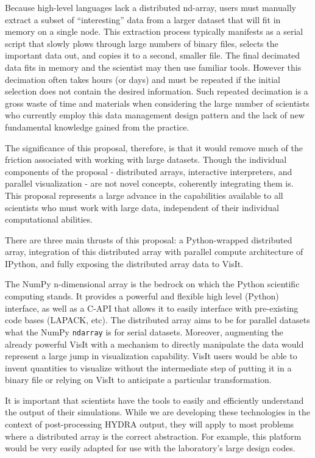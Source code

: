 \documentclass[letterpaper,11pt]{article}
\begin{document}
Because high-level languages lack a distributed nd-array, users must manually extract a subset
 of ``interesting'' data from a larger dataset that will fit in memory on a single node.  This extraction process typically manifests 
as a serial script that slowly plows through large numbers of binary files, selects the 
important data out, and copies it to a second, smaller file.  The final decimated data fits 
in memory and the scientist may then use familiar tools.   However this decimation often takes 
hours (or days) and must be repeated if the initial selection does not contain the desired 
information.  Such repeated decimation is a gross waste of time and materials when considering 
the large number of scientists who currently employ this data management design pattern and
the lack of new fundamental knowledge gained from the practice.

The significance of this proposal, therefore, is that it would remove much of the friction 
associated with working with large datasets.  Though the individual components of the 
proposal - distributed arrays, interactive interpreters, and parallel visualization - are 
not novel concepts, coherently integrating them is.  This proposal represents a large 
advance in the capabilities available to all scientists who must work with large data, 
independent of their individual computational abilities.

There are three main thrusts of this proposal: a Python-wrapped distributed array, integration 
of this distributed array with parallel compute architecture of IPython, and fully exposing 
the distributed array data to VisIt.  

The NumPy n-dimensional array is the bedrock on which the Python scientific computing stands.  
It provides a powerful and flexible high level (Python) interface, as well as a C-API that 
allows it to easily interface with pre-existing code bases (LAPACK, etc).  The distributed 
array aims to be for parallel datasets what the NumPy \texttt{ndarray} is for serial datasets.
Moreover, augmenting the already powerful VisIt with a mechanism to directly manipulate the 
data would represent a large jump in visualization capability.  VisIt users would be able 
to invent quantities to visualize without the intermediate step of putting it in a binary 
file or relying on VisIt to anticipate a particular transformation.

It is important that 
scientists have the tools to easily and efficiently understand the output of their
simulations.  While we are developing these technologies in the context of post-processing HYDRA output, 
they will apply to most problems where a distributed array is the correct abstraction.  
For example, this platform would be very easily adapted for use with the laboratory's large 
design codes.
\end{document}
